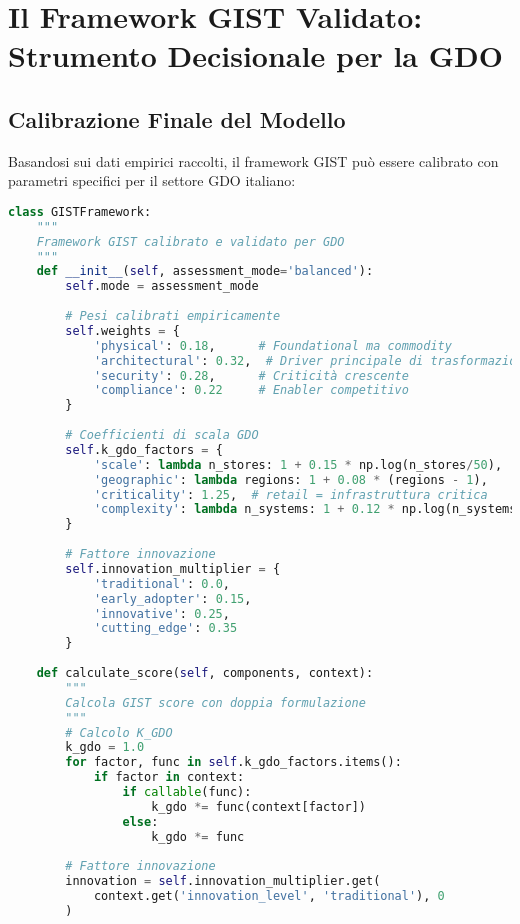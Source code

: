\section{Il Framework GIST Validato: Strumento Decisionale per la GDO}

\subsection{Calibrazione Finale del Modello}

Basandosi sui dati empirici raccolti, il framework GIST può essere calibrato con parametri specifici per il settore GDO italiano:

\begin{lstlisting}[language=Python, caption=Framework GIST calibrato]
class GISTFramework:
    """
    Framework GIST calibrato e validato per GDO
    """
    def __init__(self, assessment_mode='balanced'):
        self.mode = assessment_mode
        
        # Pesi calibrati empiricamente
        self.weights = {
            'physical': 0.18,      # Foundational ma commodity
            'architectural': 0.32,  # Driver principale di trasformazione
            'security': 0.28,      # Criticità crescente
            'compliance': 0.22     # Enabler competitivo
        }
        
        # Coefficienti di scala GDO
        self.k_gdo_factors = {
            'scale': lambda n_stores: 1 + 0.15 * np.log(n_stores/50),
            'geographic': lambda regions: 1 + 0.08 * (regions - 1),
            'criticality': 1.25,  # retail = infrastruttura critica
            'complexity': lambda n_systems: 1 + 0.12 * np.log(n_systems)
        }
        
        # Fattore innovazione
        self.innovation_multiplier = {
            'traditional': 0.0,
            'early_adopter': 0.15,
            'innovative': 0.25,
            'cutting_edge': 0.35
        }
        
    def calculate_score(self, components, context):
        """
        Calcola GIST score con doppia formulazione
        """
        # Calcolo K_GDO
        k_gdo = 1.0
        for factor, func in self.k_gdo_factors.items():
            if factor in context:
                if callable(func):
                    k_gdo *= func(context[factor])
                else:
                    k_gdo *= func
                    
        # Fattore innovazione
        innovation = self.innovation_multiplier.get(
            context.get('innovation_level', 'traditional'), 0
        )
        

\end{lstlisting}

